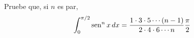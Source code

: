 \item Pruebe que, si $n$ es par,
    \[ \int_{0}^{\pi/2} \operatorname{sen}^n x \, dx = \frac{1 \cdot 3 \cdot 5 \cdots (n - 1)}{2 \cdot 4 \cdot 6 \cdots n} \frac{\pi}{2} \]
